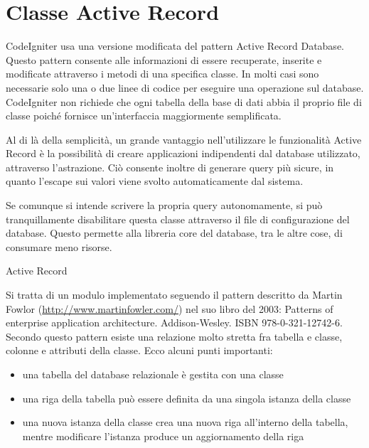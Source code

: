 \section{Classe Active Record}
\label{class:activerecord}

CodeIgniter usa una versione modificata del pattern Active Record Database. Questo pattern consente alle informazioni di essere recuperate, inserite e modificate attraverso i metodi di una specifica classe. In molti casi sono necessarie solo una o due linee di codice per eseguire una operazione sul database. CodeIgniter non richiede che ogni tabella della base di dati abbia il proprio file di classe poiché fornisce un'interfaccia maggiormente semplificata.

Al di là della semplicità, un grande vantaggio nell'utilizzare le funzionalità Active Record è la possibilità di creare applicazioni indipendenti dal database utilizzato, attraverso l'astrazione. Ciò consente inoltre di generare query più sicure, in quanto l'escape sui valori viene svolto automaticamente dal sistema.

Se comunque si intende scrivere la propria query autonomamente, si può tranquillamente disabilitare questa classe attraverso il file di configurazione del database. Questo permette alla libreria core del database, tra le altre cose, di consumare meno risorse.

\begin{deftabv}{Active Record}{Si tratta di un modulo implementato seguendo il pattern descritto da Martin Fowlor (\url{http://www.martinfowler.com/}) nel suo libro del 2003: Patterns of enterprise application architecture. Addison-Wesley. ISBN 978-0-321-12742-6. Secondo questo pattern esiste una relazione molto stretta fra tabella e classe, colonne e attributi della classe. Ecco alcuni punti importanti:
\begin{itemize}
\normalsize

\item una tabella del database relazionale è gestita con una classe
\item una riga della tabella può essere definita da una singola istanza della classe
\item una nuova istanza della classe crea una nuova riga all'interno della tabella, mentre modificare l'istanza produce un aggiornamento della riga
\end{itemize}
}
\end{deftabv}
\normalsize

